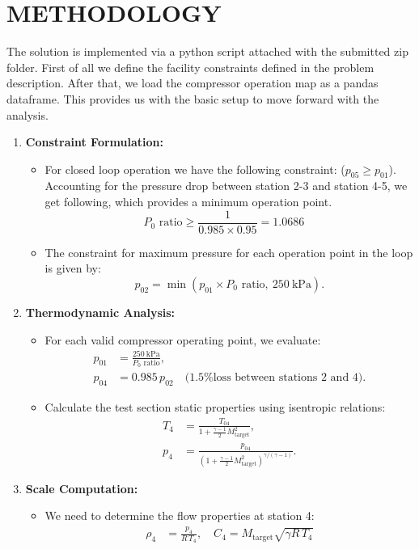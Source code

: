 \documentclass[12pt,a4paper]{article}
\begin{document}
\section*{METHODOLOGY}
The solution is implemented via a python script attached with the submitted zip folder. First of all we define the facility constraints defined in the problem description. After that, we load the compressor operation map as a pandas dataframe. This provides us with the basic setup to move forward with the analysis.
\begin{enumerate}
	\item \textbf{Constraint Formulation:}
	\begin{itemize}
		\item For closed loop operation we have the following constraint: ($p_{05} \geq p_{01}$). Accounting for the pressure drop between station 2-3 and station 4-5, we get following, which provides a minimum operation point.
		$$
		P_0\text{ ratio} \geq \frac{1}{0.985 \times 0.95} = 1.0686 \quad 
		$$
		\item The constraint for maximum pressure for each operation point in the loop is given by:
		$$
		p_{02} = \min(p_{01} \times P_0\text{ ratio},\ 250\ \text{kPa}).
		$$
	\end{itemize}
	
	\item \textbf{Thermodynamic Analysis:}
	\begin{itemize}
		\item For each valid compressor operating point, we evaluate:
		$$
		\begin{aligned}
			p_{01} &= \frac{250\ \text{kPa}}{P_0\text{ ratio}}, \\
			p_{04} &= 0.985\, p_{02} \quad \text{(1.5\% loss between stations 2 and 4)}.
		\end{aligned}
		$$
		\item Calculate the test section static properties using isentropic relations:
		$$
		\begin{aligned}
			T_4 &= \frac{T_{04}}{1 + \frac{\gamma-1}{2}M_{\text{target}}^2}, \\
			p_4 &= \frac{p_{04}}{\left(1 + \frac{\gamma-1}{2}M_{\text{target}}^2\right)^{\gamma/(\gamma-1)}}.
		\end{aligned}
		$$
	\end{itemize}
	
	\item \textbf{Scale Computation:}
	\begin{itemize}
		\item We need to determine the flow properties at station 4:
		$$
		\begin{aligned}
			\rho_4 &= \frac{p_4}{R\,T_4}, \quad C_4 = M_{\text{target}}\sqrt{\gamma R\,T_4}
		\end{aligned}
		$$
		

\end{itemize}
\end{enumerate}
\end{document}
